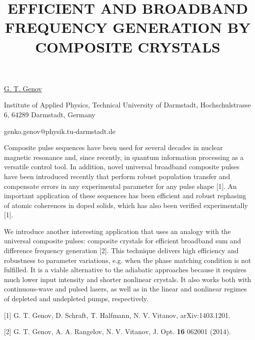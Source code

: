 \title{EFFICIENT AND BROADBAND FREQUENCY GENERATION BY COMPOSITE CRYSTALS}

\underline{G. T. Genov} 

{\normalsize{\vspace{-4mm}
Institute of Applied Physics, Technical University of Darmstadt,
Hochschulstrasse 6, 64289 Darmstadt, Germany

\email genko.genov@physik.tu-darmstadt.de}}

Composite pulse sequences have been used for several decades in nuclear magnetic resonance and, since recently, in quantum information processing as a versatile control tool. In addition, novel universal broadband composite pulses have been introduced recently that perform robust population transfer and compensate errors in any experimental parameter for any pulse shape [1]. An important application of these sequences has been efficient and robust rephasing of atomic coherences in doped solids, which has also been verified experimentally [1].

We introduce another interesting application that uses an analogy with the universal composite pulses: composite crystals for efficient broadband sum and difference frequency generation [2]. This technique delivers high efficiency and robustness to parameter variations, e.g. when the phase matching condition is not fulfilled. It is a viable alternative to the adiabatic approaches because it requires much lower input intensity and shorter nonlinear crystals. It also works both with continuous-wave and pulsed lasers, as well as in the linear and nonlinear regimes of depleted and undepleted pumps, respectively.

{\normalsize
[1] G. T. Genov, D. Schraft, T. Halfmann, N. V. Vitanov, arXiv:1403.1201.
\vsp

[2] G. T. Genov, A. A. Rangelov, N. V. Vitanov, J. Opt. \textbf{16} 062001 (2014).
}

\vspace{\baselineskip}
